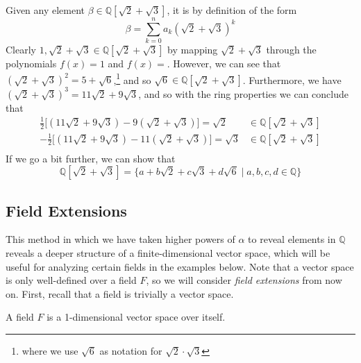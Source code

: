   \begin{example}
    Given any element $\beta \in \mathbb{Q}[\sqrt{2} + \sqrt{3}]$, it is by definition of the form 
    \begin{equation}
      \beta = \sum_{k=0}^n a_k (\sqrt{2} + \sqrt{3})^k 
    \end{equation} 
    Clearly $1, \sqrt{2} + \sqrt{3} \in \mathbb{Q}[\sqrt{2} + \sqrt{3}]$ by mapping $\sqrt{2} + \sqrt{3}$ through the polynomials $f(x) = 1$ and $f(x) = $. However, we can see that $(\sqrt{2} + \sqrt{3})^2 = 5 + \sqrt{6}$,\footnote{where we use $\sqrt{6}$ as notation for $\sqrt{2} \cdot \sqrt{3}$} and so $\sqrt{6} \in \mathbb{Q}[\sqrt{2} + \sqrt{3}]$. Furthermore, we have $(\sqrt{2} + \sqrt{3})^3 = 11 \sqrt{2} + 9 \sqrt{3}$, and so with the ring properties we can conclude that 
    \begin{align}
      \frac{1}{2} \big[ (11 \sqrt{2} + 9 \sqrt{3}) - 9 (\sqrt{2} + \sqrt{3})\big] = \sqrt{2} & \in \mathbb{Q}[\sqrt{2} + \sqrt{3}] \\
      -\frac{1}{2} \big[ (11 \sqrt{2} + 9 \sqrt{3}) - 11 (\sqrt{2} + \sqrt{3})\big] = \sqrt{3} & \in \mathbb{Q}[\sqrt{2} + \sqrt{3}] \\
    \end{align} 
    If we go a bit further, we can show that 
    \begin{equation}
      \mathbb{Q}[\sqrt{2} + \sqrt{3}] = \{a + b \sqrt{2} + c \sqrt{3} + d\sqrt{6} \mid a, b, c, d \in \mathbb{Q} \}
    \end{equation}
  \end{example}

\subsection{Field Extensions}

  This method in which we have taken higher powers of $\alpha$ to reveal elements in $\mathbb{Q}$ reveals a deeper structure of a finite-dimensional vector space, which will be useful for analyzing certain fields in the examples below. Note that a vector space is only well-defined over a field $F$, so we will consider \textit{field extensions} from now on. First, recall that a field is trivially a vector space. 

  \begin{lemma}
    A field $F$ is a 1-dimensional vector space over itself. 
  \end{lemma} 

